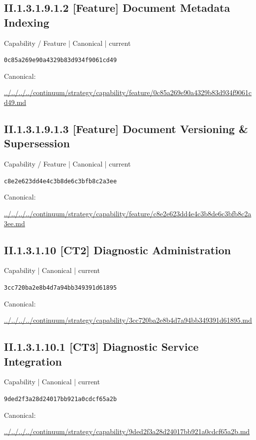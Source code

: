 \documentclass[10pt,a4paper]{article}
\begin{document}
\subsection*{II.1.3.1.9.1.2 [Feature] Document Metadata Indexing}
{\small Capability / Feature | Canonical | current}\par
\texttt{0c85a269e90a4329b83d934f9061cd49}\par
Canonical: \par
{\footnotesize\url{../../../../continuum/strategy/capability/feature/0c85a269e90a4329b83d934f9061cd49.md}}\par
\subsection*{II.1.3.1.9.1.3 [Feature] Document Versioning \& Supersession}
{\small Capability / Feature | Canonical | current}\par
\texttt{c8e2e623dd4e4c3b8de6c3bfb8c2a3ee}\par
Canonical: \par
{\footnotesize\url{../../../../continuum/strategy/capability/feature/c8e2e623dd4e4c3b8de6c3bfb8c2a3ee.md}}\par
\subsection*{II.1.3.1.10 [CT2] Diagnostic Administration}
{\small Capability | Canonical | current}\par
\texttt{3cc720ba2e8b4d7a94bb349391d61895}\par
Canonical: \par
{\footnotesize\url{../../../../continuum/strategy/capability/3cc720ba2e8b4d7a94bb349391d61895.md}}\par
\subsection*{II.1.3.1.10.1 [CT3] Diagnostic Service Integration}
{\small Capability | Canonical | current}\par
\texttt{9ded2f3a28d24017bb921a0cdcf65a2b}\par
Canonical: \par
{\footnotesize\url{../../../../continuum/strategy/capability/9ded2f3a28d24017bb921a0cdcf65a2b.md}}\par
\end{document}
